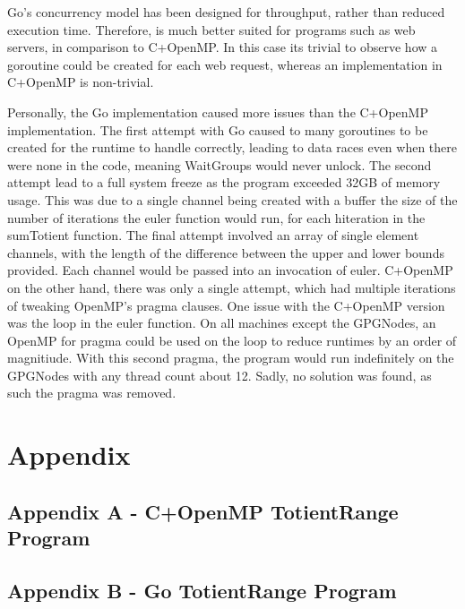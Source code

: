 \documentclass[11pt,a4paper,titlepage]{article}
\begin{document}
Go's concurrency model has been designed for throughput, rather than reduced execution time.
Therefore, is much better suited for programs such as web servers, in comparison to C+OpenMP.
In this case its trivial to observe how a goroutine could be created for each web request, whereas an implementation in C+OpenMP is non-trivial.

Personally, the Go implementation caused more issues than the C+OpenMP implementation.
The first attempt with Go caused to many goroutines to be created for the runtime to handle correctly, leading to data races even when there were none in the code, meaning WaitGroups would never unlock.
The second attempt lead to a full system freeze as the program exceeded 32GB of memory usage.
This was due to a single channel being created with a buffer the size of the number of iterations the euler function would run, for each hiteration in the sumTotient function.
The final attempt involved an array of single element channels, with the length of the difference between the upper and lower bounds provided.
Each channel would be passed into an invocation of euler.
C+OpenMP on the other hand, there was only a single attempt, which had multiple iterations of tweaking OpenMP's pragma clauses.
One issue with the C+OpenMP version was the loop in the euler function.
On all machines except the GPGNodes, an OpenMP for pragma could be used on the loop to reduce runtimes by an order of magnitiude.
With this second pragma, the program would run indefinitely on the GPGNodes with any thread count about 12.
Sadly, no solution was found, as such the pragma was removed.

\section{Appendix}
\subsection{Appendix A - C+OpenMP TotientRange Program}
\lstset{linewidth=\textwidth}


\subsection{Appendix B - Go TotientRange Program}
\lstset{linewidth=\textwidth}

\end{document}
